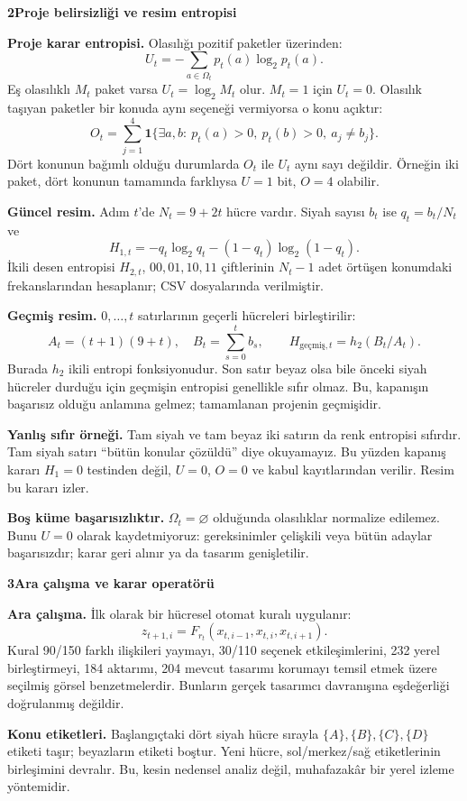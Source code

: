 \documentclass[11pt,a4paper]{article}
\newcommand{\heading}[2]{{\sffamily\small\color{blue!40!black}#1}\par{\sffamily\LARGE\bfseries#2}\par\vspace{3mm}}
\newcommand{\page}[2]{\newpage\heading{#1}{#2}}
\begin{document}
\page{Hesaplama çerçevesi}{2\quad Proje belirsizliği ve resim entropisi}
\textbf{Proje karar entropisi.} Olasılığı pozitif paketler üzerinden:
\[
U_t=-\sum_{a\in\Omega_t}p_t(a)\log_2p_t(a).
\]
Eş olasılıklı $M_t$ paket varsa $U_t=\log_2 M_t$ olur. $M_t=1$ için $U_t=0$.
Olasılık taşıyan paketler bir konuda aynı seçeneği vermiyorsa o konu açıktır:
\[
O_t=\sum_{j=1}^4\mathbf1\{\exists a,b:\ p_t(a)>0,\ p_t(b)>0,\ a_j\ne b_j\}.
\]
Dört konunun bağımlı olduğu durumlarda $O_t$ ile $U_t$ aynı sayı değildir.
Örneğin iki paket, dört konunun tamamında farklıysa $U=1$ bit, $O=4$ olabilir.

\textbf{Güncel resim.} Adım $t$'de $N_t=9+2t$ hücre vardır. Siyah sayısı
$b_t$ ise $q_t=b_t/N_t$ ve
\[
H_{1,t}=-q_t\log_2q_t-(1-q_t)\log_2(1-q_t).
\]
İkili desen entropisi $H_{2,t}$, $00,01,10,11$ çiftlerinin $N_t-1$ adet
örtüşen konumdaki frekanslarından hesaplanır; CSV dosyalarında verilmiştir.

\textbf{Geçmiş resim.} $0,\ldots,t$ satırlarının geçerli hücreleri birleştirilir:
\[
A_t=(t+1)(9+t),\quad B_t=\sum_{s=0}^t b_s,\qquad
H_{\mathrm{geçmiş},t}=h_2(B_t/A_t).
\]
Burada $h_2$ ikili entropi fonksiyonudur. Son satır beyaz olsa bile önceki
siyah hücreler durduğu için geçmişin entropisi genellikle sıfır olmaz.
Bu, kapanışın başarısız olduğu anlamına gelmez; tamamlanan projenin geçmişidir.

\textbf{Yanlış sıfır örneği.} Tam siyah ve tam beyaz iki satırın da renk
entropisi sıfırdır. Tam siyah satırı ``bütün konular çözüldü'' diye okuyamayız.
Bu yüzden kapanış kararı $H_1=0$ testinden değil, $U=0$, $O=0$ ve kabul
kayıtlarından verilir. Resim bu kararı izler.

\textbf{Boş küme başarısızlıktır.} $\Omega_t=\varnothing$ olduğunda olasılıklar
normalize edilemez. Bunu $U=0$ olarak kaydetmiyoruz: gereksinimler çelişkili
veya bütün adaylar başarısızdır; karar geri alınır ya da tasarım genişletilir.

\page{Kararlardan resme}{3\quad Ara çalışma ve karar operatörü}
\textbf{Ara çalışma.} İlk olarak bir hücresel otomat kuralı uygulanır:
\[
z_{t+1,i}=F_{r_t}(x_{t,i-1},x_{t,i},x_{t,i+1}).
\]
Kural 90/150 farklı ilişkileri yaymayı, 30/110 seçenek etkileşimlerini,
232 yerel birleştirmeyi, 184 aktarımı, 204 mevcut tasarımı korumayı temsil
etmek üzere seçilmiş görsel benzetmelerdir. Bunların gerçek tasarımcı
davranışına eşdeğerliği doğrulanmış değildir.

\textbf{Konu etiketleri.} Başlangıçtaki dört siyah hücre sırayla
$\{A\},\{B\},\{C\},\{D\}$ etiketi taşır; beyazların etiketi boştur.
Yeni hücre, sol/merkez/sağ etiketlerinin birleşimini devralır. Bu,
kesin nedensel analiz değil, muhafazakâr bir yerel izleme yöntemidir.
\end{document}
